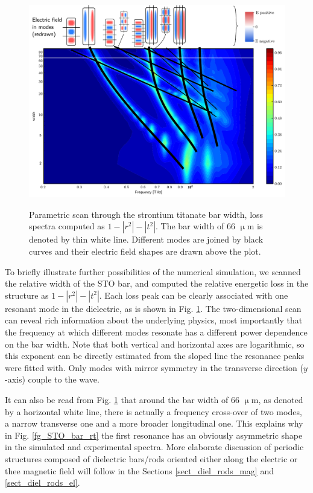 \begin{figure}[h] \centering \caption{Parametric scan through the strontium titanate bar width, loss spectra computed as $1-|r^2|-|t^2|$. The bar width of 66 $\upmu$m is denoted by thin white line. Different modes are joined by black curves and their electric field shapes are drawn above the plot.} \includegraphics[width=\textwidth]{img/STOBarC_modes2.pdf} \label{fg_STO_bar_modes} \end{figure}
To briefly illustrate further possibilities of the numerical simulation, we scanned the relative width of the STO bar, and computed the relative energetic loss in the structure as $1-|r^2|-|t^2|$. Each loss peak can be clearly associated with one resonant mode in the dielectric, as is shown in Fig. \ref{fg_STO_bar_modes}. The two-dimensional scan can reveal rich information about the underlying physics, most importantly that the frequency at which different modes resonate has a different power dependence on the bar width. Note that both vertical and horizontal axes are logarithmic, so this exponent can be directly estimated from the sloped line the resonance peaks were fitted with. Only modes with mirror symmetry in the transverse direction ($y$-axis) couple to the wave.

It can also be read from Fig. \ref{fg_STO_bar_modes} that around the bar width of 66 $\upmu$m, as denoted by a horizontal white line, there is actually a frequency cross-over of two modes, a narrow transverse one and a more broader longitudinal one. This explains why in Fig. \ref{fg_STO_bar_rt} the first resonance has an obviously asymmetric shape in the simulated and experimental spectra.  %
More elaborate discussion of periodic structures composed of dielectric bars/rods oriented either along the electric or thee magnetic field will follow in the Sections \ref{sect_diel_rods_mag} and \ref{sect_diel_rods_el}.
